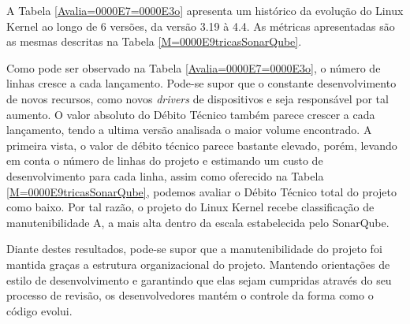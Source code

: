 A Tabela \ref{Avalia=0000E7=0000E3o} apresenta um histórico da evolução
do Linux Kernel ao longo de 6 versões, da versão 3.19 à 4.4. As métricas
apresentadas são as mesmas descritas na Tabela \ref{M=0000E9tricasSonarQube}.

Como pode ser observado na Tabela \ref{Avalia=0000E7=0000E3o}, o
número de linhas cresce a cada lançamento. Pode-se supor que o constante
desenvolvimento de novos recursos, como novos \emph{drivers }de dispositivos
e seja responsável por tal aumento. O valor absoluto do Débito Técnico
também parece crescer a cada lançamento, tendo a ultima versão analisada
o maior volume encontrado. A primeira vista, o valor de débito técnico
parece bastante elevado, porém, levando em conta o número de linhas
do projeto e estimando um custo de desenvolvimento para cada linha,
assim como oferecido na Tabela \ref{M=0000E9tricasSonarQube}, podemos
avaliar o Débito Técnico total do projeto como baixo. Por tal razão,
o projeto do Linux Kernel recebe classificação de manutenibilidade
A, a mais alta dentro da escala estabelecida pelo SonarQube.

Diante destes resultados, pode-se supor que a manutenibilidade do
projeto foi mantida graças a estrutura organizacional do projeto.
Mantendo orientações de estilo de desenvolvimento e garantindo que
elas sejam cumpridas através do seu processo de revisão, os desenvolvedores
mantém o controle da forma como o código evolui. 


